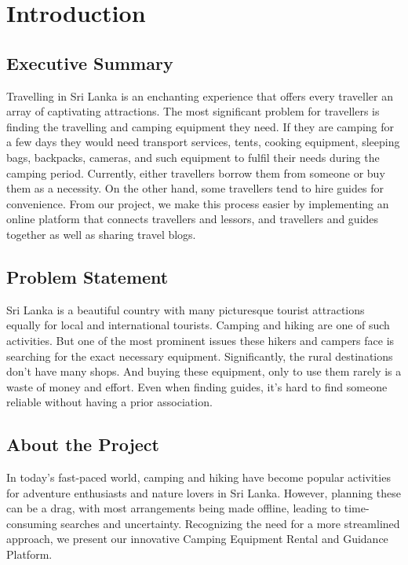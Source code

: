 \section{Introduction}
\subsection{Executive Summary}

Travelling in Sri Lanka is an enchanting experience that offers every traveller an array of captivating attractions. The most significant problem for travellers is finding the travelling and camping equipment they need. If they are camping for a few days they would need transport services, tents, cooking equipment, sleeping bags, backpacks, cameras, and such equipment to fulfil their needs during the camping period. Currently, either travellers borrow them from someone or buy them as a necessity. On the other hand, some travellers tend to hire guides for convenience.  From our project, we make this process easier by implementing an online platform that connects travellers and lessors, and travellers and guides together as well as sharing travel blogs. 		

\subsection{Problem Statement}
Sri Lanka is a beautiful country with many picturesque tourist attractions equally for local and international tourists. Camping and hiking are one of such activities. But one of the most prominent issues these hikers and campers face is searching for the exact necessary equipment. Significantly, the rural destinations don’t have many shops. And buying these equipment, only to use them rarely is a waste of money and effort. Even when finding guides, it’s hard to find someone reliable without having a prior association.


\subsection{About the Project}
In today's fast-paced world, camping and hiking have become popular activities for adventure enthusiasts and nature lovers in Sri Lanka. However, planning these can be a drag, with most arrangements being made offline, leading to time-consuming searches and uncertainty. Recognizing the need for a more streamlined approach, we present our innovative Camping Equipment Rental and Guidance Platform.

